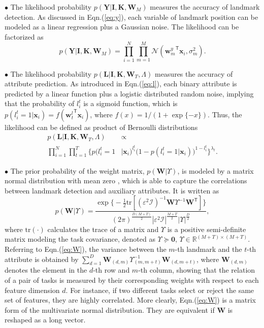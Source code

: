 \documentclass[10pt,journal,compsoc]{IEEEtran}
\newcommand{\x} {\textbf{x}}
\newcommand{\w} {\textbf{w}}
\newcommand{\W} {\textbf{W}}
\newcommand{\I} {\textbf{I}}
\newcommand{\K} {\textbf{K}}
\newcommand{\Y} {\textbf{Y}}
\newcommand{\LL} {\textbf{L}}
\newcommand{\trans}[1]{{#1}^{\ensuremath{\mathsf{T}}}}
\begin{document}
$\bullet$ The likelihood probability $p(\Y|\I,\K,\W_{M})$ measures the accuracy of landmark detection. As discussed in Eqn.(\ref{eq:y}), each variable of landmark position can be modeled as a linear regression plus a Gaussian noise.
The likelihood can be factorized as
\begin{equation}\label{eq:Y}
p(\Y|\I,\K,\W_{M})=\prod_{i=1}^N\prod_{m=1}^M\mathcal{N}(\trans{\w^y_m}\x_i,\sigma^2_m).
\end{equation}


$\bullet$ The likelihood probability $p(\LL|\I,\K,\W_{T},\Lambda)$ measures the accuracy of attribute prediction. As introduced in Eqn.(\ref{eq:l}), each binary attribute is predicted by a linear function plus a logistic distributed random noise, implying that the probability of $l^t_i$ is a sigmoid function, which is $p(l^t_i=1|\x_i)=f(\trans{\w_t^l}\x_i)$, where $f(x)=1/(1+\exp\{-x\})$.
Thus, the likelihood can be defined as product of Bernoulli distributions
\begin{equation}\label{eq:L}
\begin{split}
p(\LL|\I,\K,\W_{T},\Lambda)&\propto\\\prod_{i=1}^N\prod_{t=1}^T
\{p(l^t_i=1&|\x_i)^{l^t_i}\big(1-p(l^t_i=1|\x_i)\big)^{1-l^t_i}\}^{\lambda_t}.
\end{split}
\end{equation}

$\bullet$ The prior probability of the weight matrix, $p(\W|\Upsilon)$, is modeled by a matrix normal distribution with mean zero \cite{gupta1999matrix}, which is able to capture the correlations between landmark detection and auxiliary attributes.
It is written as
\begin{equation}\label{eq:W}
p(\W|\Upsilon)=\frac{\exp\big\{-\frac{1}{2}\mathrm{tr}[(\varepsilon^2\mathcal{I})^{-1}
\W\Upsilon^{-1}\trans{\W}]\big\}}{(2\pi)^{\frac{D(M+T)}{2}}
|\varepsilon^2\mathcal{I}|^{\frac{M+T}{2}}|\Upsilon|^{\frac{D}{2}}},
\end{equation}
where $\mathrm{tr}(\cdot)$ calculates the trace of a matrix and $\Upsilon$ is a positive semi-definite matrix modeling the task covariance, denoted as $\Upsilon\succeq\textbf{0}$, $\Upsilon\in\mathbb{R}^{(M+T)\times(M+T)}$.
Referring to Eqn.(\ref{eq:W}), the variance between the $m$-th landmark and the $t$-th attribute is obtained by $\sum_{d=1}^D\W_{(d,m)}\Upsilon^{-1}_{(m,m+t)}\W_{(d,m+t)}$, where $\W_{(d,m)}$ denotes the element in the $d$-th row and $m$-th column, showing that the relation of a pair of tasks is measured by their corresponding weights with respect to each feature dimension $d$.
For instance, if two different tasks select or reject the same set of features, they are highly correlated.
More clearly, Eqn.(\ref{eq:W}) is a matrix form of the multivariate normal distribution. They are equivalent if $\W$ is reshaped as a long vector.
\end{document}
